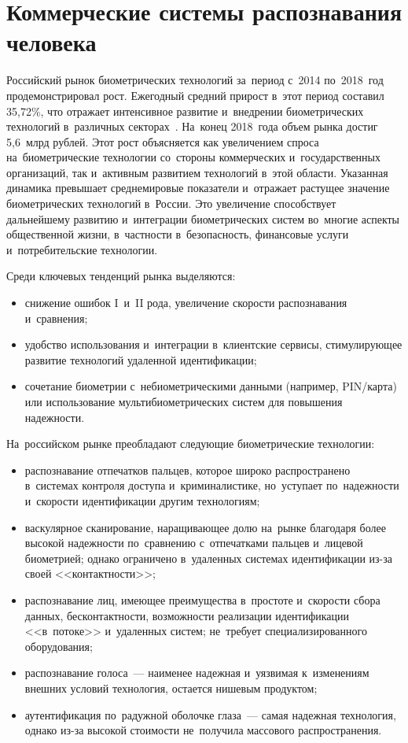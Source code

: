 \section{Коммерческие системы распознавания человека}\label{sec:ch1/commercial}

Российский рынок биометрических технологий за~период с~2014 по~2018~год
продемонстрировал рост. Ежегодный средний прирост в~этот период
составил 35,72\%, что отражает интенсивное развитие и~внедрении
биометрических технологий в~различных секторах~\cite{Nazarova2023biometry}.
На~конец 2018~года объем рынка достиг 5,6~млрд рублей. Этот рост
объясняется как увеличением спроса на~биометрические технологии
со~стороны коммерческих и~государственных организаций, так и~активным
развитием технологий в~этой области. Указанная динамика
превышает среднемировые показатели и~отражает растущее значение
биометрических технологий в~России. Это увеличение способствует
дальнейшему развитию и~интеграции биометрических систем во~многие
аспекты общественной жизни, в~частности в~безопасность, финансовые
услуги и~потребительские технологии.

Среди ключевых тенденций рынка выделяются:
\begin{itemize}
    \item снижение ошибок I~и~II рода, увеличение скорости распознавания
          и~сравнения;
    \item удобство использования и~интеграции в~клиентские сервисы,
          стимулирующее развитие технологий удаленной идентификации;
    \item сочетание биометрии с~небиометрическими данными (например,
          PIN/карта) или использование мультибиометрических систем для
          повышения надежности.
\end{itemize}

На~российском рынке преобладают следующие биометрические технологии:
\begin{itemize}
    \item распознавание отпечатков пальцев, которое широко распространено
          в~системах контроля доступа и~криминалистике, но~уступает
          по~надежности и~скорости идентификации другим технологиям;
    \item васкулярное сканирование, наращивающее долю на~рынке благодаря
          более высокой надежности по~сравнению с~отпечатками пальцев
          и~лицевой биометрией; однако ограничено в~удаленных системах
          идентификации из-за своей <<контактности>>;
    \item распознавание лиц, имеющее преимущества в~простоте и~скорости
          сбора данных, бесконтактности, возможности реализации
          идентификации <<в~потоке>> и~удаленных систем; не~требует
          специализированного оборудования;
    \item распознавание голоса~--- наименее надежная и~уязвимая
          к~изменениям внешних условий технология, остается нишевым
          продуктом;
    \item аутентификация по~радужной оболочке глаза~--- самая надежная
          технология, однако из-за высокой стоимости не~получила
          массового распространения.
\end{itemize}

